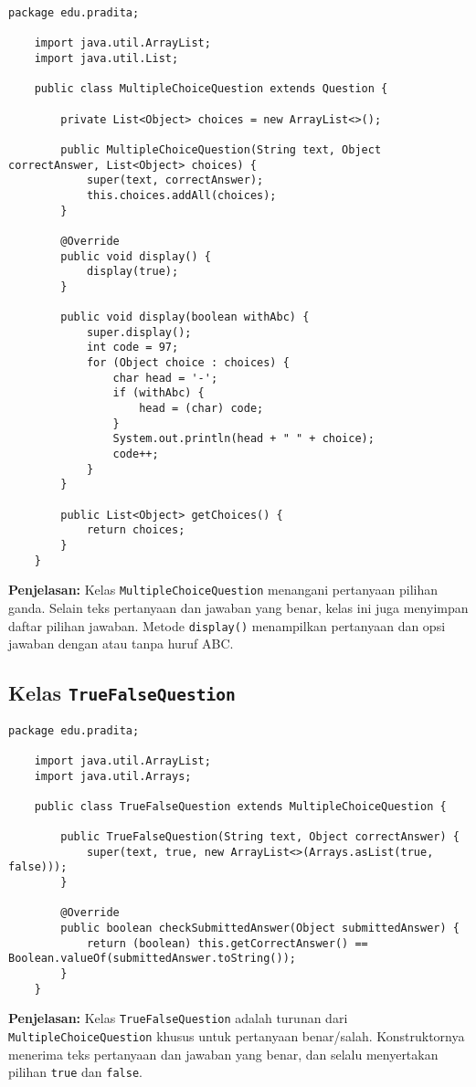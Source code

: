\begin{lstlisting}[style=JavaStyle]
	package edu.pradita;
	
	import java.util.ArrayList;
	import java.util.List;
	
	public class MultipleChoiceQuestion extends Question {
		
		private List<Object> choices = new ArrayList<>();
		
		public MultipleChoiceQuestion(String text, Object correctAnswer, List<Object> choices) {
			super(text, correctAnswer);
			this.choices.addAll(choices);
		}
		
		@Override
		public void display() {
			display(true);
		}
		
		public void display(boolean withAbc) {
			super.display();
			int code = 97;
			for (Object choice : choices) {
				char head = '-';
				if (withAbc) {
					head = (char) code;
				}
				System.out.println(head + " " + choice);
				code++;
			}
		}
		
		public List<Object> getChoices() {
			return choices;
		}
	}
\end{lstlisting}

\textbf{Penjelasan:} Kelas \texttt{MultipleChoiceQuestion} menangani pertanyaan pilihan ganda. Selain teks pertanyaan dan jawaban yang benar, kelas ini juga menyimpan daftar pilihan jawaban. Metode \texttt{display()} menampilkan pertanyaan dan opsi jawaban dengan atau tanpa huruf ABC.

\subsection{Kelas \texttt{TrueFalseQuestion}}

\begin{lstlisting}[style=JavaStyle]
	package edu.pradita;
	
	import java.util.ArrayList;
	import java.util.Arrays;
	
	public class TrueFalseQuestion extends MultipleChoiceQuestion {
		
		public TrueFalseQuestion(String text, Object correctAnswer) {
			super(text, true, new ArrayList<>(Arrays.asList(true, false)));
		}
		
		@Override
		public boolean checkSubmittedAnswer(Object submittedAnswer) {
			return (boolean) this.getCorrectAnswer() == Boolean.valueOf(submittedAnswer.toString());
		}
	}
\end{lstlisting}

\textbf{Penjelasan:} Kelas \texttt{TrueFalseQuestion} adalah turunan dari \texttt{MultipleChoiceQuestion} khusus untuk pertanyaan benar/salah. Konstruktornya menerima teks pertanyaan dan jawaban yang benar, dan selalu menyertakan pilihan \texttt{true} dan \texttt{false}.


